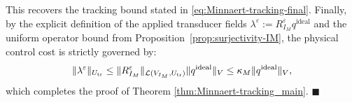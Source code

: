 \documentclass[11pt,a4paper]{article}
\numberwithin{equation}{section}
\newcommand{\veps}{\varepsilon}
\begin{document}
This recovers the tracking bound stated in \eqref{eq:Minnaert-tracking-final}.
\newline
Finally, by the explicit definition of the applied transducer fields $\lambda^\veps := R_{I_M}^\veps q^{\mathrm{ideal}}$ and the uniform operator bound from Proposition~\ref{prop:surjectivity-IM}, the physical control cost is strictly governed by:
\[
 \|\lambda^\veps\|_{U_{\rm tr}} \le \|R_{I_M}^\veps\|_{\mathcal{L}(V_{I_M},U_{\rm tr})} \|q^{\mathrm{ideal}}\|_V \le \kappa_M \|q^{\mathrm{ideal}}\|_V,
\]
which completes the proof of Theorem \ref{thm:Minnaert-tracking_main}. \hfill $\blacksquare$
\end{document}
